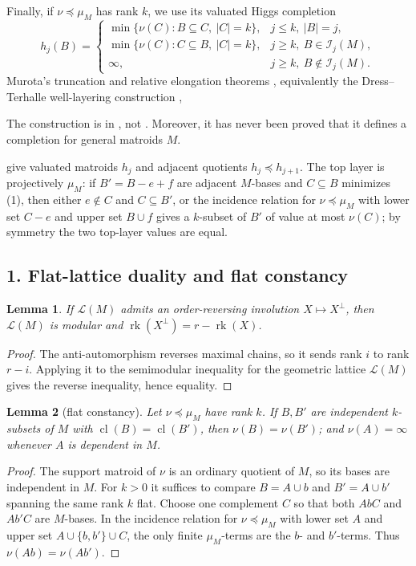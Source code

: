\documentclass[12pt]{article}
\newcommand{\cL}{\mathcal L}
\newcommand{\rk}{\operatorname{rk}}
\newcommand{\cl}{\operatorname{cl}}
\newtheorem{lemma}{Lemma}
\newcommand{\review}[1]{\begin{reviewbox}#1\end{reviewbox}}
\begin{document}
Finally, if $\nu\preceq\mu_M$ has rank $k$, we use its valuated Higgs
completion
\[
 h_j(B)=
 \begin{cases}
 \min\{\nu(C): B\subseteq C,\ |C|=k\}, & j\le k,\ |B|=j,\\
 \min\{\nu(C): C\subseteq B,\ |C|=k\}, & j\ge k,\ B\in\mathcal I_j(M),\\
 \infty, & j\ge k,\ B\notin\mathcal I_j(M).
 \end{cases}                                                \tag{1}
\]
Murota's truncation and relative elongation theorems \cite[Theorems 2.1 and 4.1]{Murota}, equivalently the
Dress--Terhalle well-layering construction \cite{DT},
\review{The construction is in \cite{Murota}, not \cite{DT}. Moreover, it has never been proved that it defines a completion for general matroids $M$. }
give valuated matroids
$h_j$ and adjacent quotients $h_j\preceq h_{j+1}$.  The top layer is
projectively $\mu_M$: if $B'=B-e+f$ are adjacent $M$-bases and
$C\subseteq B$ minimizes (1), then either $e\notin C$ and $C\subseteq B'$,
or the incidence relation for $\nu\preceq\mu_M$ with lower set $C-e$ and
upper set $B\cup f$ gives a $k$-subset of $B'$ of value at most
$\nu(C)$; by symmetry the two top-layer values are equal.

\subsection*{1. Flat-lattice duality and flat constancy}

\begin{lemma}\label{lem:modular}
If $\cL(M)$ admits an order-reversing involution $X\mapsto X^\perp$,
then $\cL(M)$ is modular and $\rk(X^\perp)=r-\rk(X)$.
\end{lemma}

\begin{proof}
The anti-automorphism reverses maximal chains, so it sends rank $i$ to
rank $r-i$.  Applying it to the semimodular inequality for the geometric
lattice $\cL(M)$ gives the reverse inequality, hence equality.
\end{proof}

\begin{lemma}[flat constancy]\label{lem:flatconst}
Let $\nu\preceq\mu_M$ have rank $k$.  If $B,B'$ are independent
$k$-subsets of $M$ with $\cl(B)=\cl(B')$, then $\nu(B)=\nu(B')$; and
$\nu(A)=\infty$ whenever $A$ is dependent in $M$.
\end{lemma}

\begin{proof}
The support matroid of $\nu$ is an ordinary quotient of $M$, so its
bases are independent in $M$.  For $k>0$ it suffices to compare
$B=A\cup b$ and $B'=A\cup b'$ spanning the same rank $k$ flat.  Choose
one complement $C$ so that both $AbC$ and $Ab'C$ are $M$-bases.  In the
incidence relation for $\nu\preceq\mu_M$ with lower set $A$ and upper
set $A\cup\{b,b'\}\cup C$, the only finite $\mu_M$-terms are the
$b$- and $b'$-terms.  Thus $\nu(Ab)=\nu(Ab')$.
\end{proof}
\end{document}
